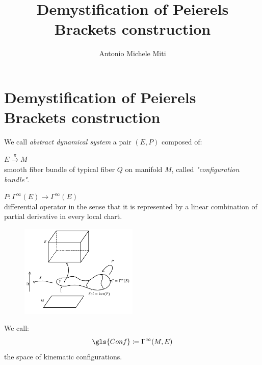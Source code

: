 \documentclass[a4paper,10pt]{report}
\title{Demystification of Peierels Brackets construction}
\author{Antonio Michele Miti}
\date{\vspace{-5ex}} %
\begin{document}

	\section*{Demystification of Peierels Brackets construction}

	\begin{definition}\label{Def:AbstracDynamicalSystem}
		We call \emph{abstract dynamical system}
		a pair $(E,P )$ composed of:
		\begin{compactitemize}
			\item $E \xrightarrow{\pi} M$ \\
			smooth fiber bundle of typical fiber $Q$ on  manifold $M$, called \emph{"configuration bundle"}.
			\item	$ P : \Gamma^\infty(E) \rightarrow \Gamma^\infty(E)$ \\
			differential operator %
			in the sense that it is represented by a linear combination of partial derivative in every local chart.
		\end{compactitemize}
	\end{definition}

	\begin{figure}[h!]
		\centering
		\includegraphics[width=0.5\textwidth]{../Pictures/AbstractFieldTheory}
	\end{figure}

	\begin{definition}
		We call:
		\begin{displaymath}
			\gls{Conf} \coloneqq \Gamma^\infty(M,E)
		\end{displaymath}
		the space of kinematic configurations.
	\end{definition}
\end{document}
